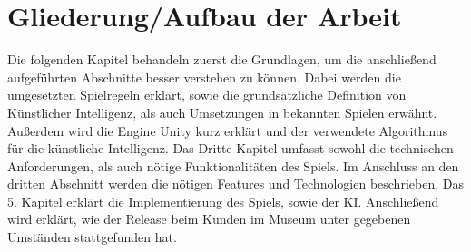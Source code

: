 

\section{Gliederung/Aufbau der Arbeit}
\label{ch:Einleitung:sec:Gliederung}


Die folgenden Kapitel behandeln zuerst die Grundlagen, um die anschließend aufgeführten Abschnitte besser verstehen zu können. Dabei werden die umgesetzten Spielregeln erklärt, sowie die grundsätzliche Definition von Künstlicher Intelligenz, als auch Umsetzungen in bekannten Spielen erwähnt. Außerdem wird die Engine Unity kurz erklärt und der verwendete Algorithmus für die künstliche Intelligenz. Das Dritte Kapitel umfasst sowohl die technischen Anforderungen, als auch nötige Funktionalitäten des Spiels.
Im Anschluss an den dritten Abschnitt werden die nötigen Features und Technologien beschrieben.
Das 5. Kapitel erklärt die Implementierung des Spiels, sowie der KI. Anschließend wird erklärt, wie der Release beim Kunden im Museum unter gegebenen Umständen stattgefunden hat.

